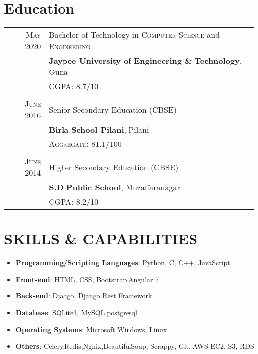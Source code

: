 \documentclass[a4paper,1pt]{article}
\begin{document}
\section{Education}
\begin{tabular}{rl}	
 \textsc{May} 2020 & Bachelor of Technology in \textsc{Computer Science} and \textsc{Engineering}\\& \textbf{Jaypee University of Engineering \& Technology}, Guna\\&
 \normalsize \textsc{CGPA}: 8.7/10\\&\\
\textsc{June} 2016& Senior Secondary Education  (\textsc{CBSE})\\&
\normalsize\textbf{Birla School Pilani}, Pilani
\\&\normalsize \textsc{Aggregate}: 81.1/100\\&\\

\textsc{June} 2014& Higher Secondary Education   (\textsc{CBSE})\\&
\normalsize\textbf{S.D Public School}, Muzaffaranagar
\\&\normalsize \textsc{CGPA}: 8.2/10\\

\end{tabular}\bigskip\par

\section{SKILLS & CAPABILITIES}
\begin{itemize}
\item \textbf{Programming/Scripting Languages}: Python, C, C++, JavaScript
\item \textbf{Front-end}: HTML, CSS, Bootstrap,Angular 7
\item \textbf{Back-end}: Django, Django Rest Framework
\item \textbf{Database}: SQLite3, MySQL,postgresql
\item \textbf{Operating Systems}: Microsoft Windows, Linux
\item \textbf{Others}: Celery,Redis,Ngnix,BeautifulSoup, Scrappy, Git, AWS-EC2, S3, RDS
\end{itemize}\bigskip\par

\end{document}
